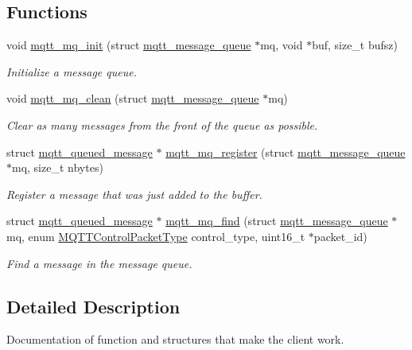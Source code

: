 \subsection*{Functions}
\begin{DoxyCompactItemize}
\item 
void \hyperlink{group__details_ga0da861c969387bf8d0229924543d9bb7}{mqtt\+\_\+mq\+\_\+init} (struct \hyperlink{structmqtt__message__queue}{mqtt\+\_\+message\+\_\+queue} $\ast$mq, void $\ast$buf, size\+\_\+t bufsz)
\begin{DoxyCompactList}\small\item\em Initialize a message queue. \end{DoxyCompactList}\item 
void \hyperlink{group__details_gadb54c413b4d884619c50cc20ee6eb084}{mqtt\+\_\+mq\+\_\+clean} (struct \hyperlink{structmqtt__message__queue}{mqtt\+\_\+message\+\_\+queue} $\ast$mq)
\begin{DoxyCompactList}\small\item\em Clear as many messages from the front of the queue as possible. \end{DoxyCompactList}\item 
struct \hyperlink{structmqtt__queued__message}{mqtt\+\_\+queued\+\_\+message} $\ast$ \hyperlink{group__details_gaa34e6af3ab1af60ebf8fe7b86be868fc}{mqtt\+\_\+mq\+\_\+register} (struct \hyperlink{structmqtt__message__queue}{mqtt\+\_\+message\+\_\+queue} $\ast$mq, size\+\_\+t nbytes)
\begin{DoxyCompactList}\small\item\em Register a message that was just added to the buffer. \end{DoxyCompactList}\item 
struct \hyperlink{structmqtt__queued__message}{mqtt\+\_\+queued\+\_\+message} $\ast$ \hyperlink{group__details_ga1ffcd45af057865a0d85b4e9e24789a2}{mqtt\+\_\+mq\+\_\+find} (struct \hyperlink{structmqtt__message__queue}{mqtt\+\_\+message\+\_\+queue} $\ast$mq, enum \hyperlink{group__unpackers_gacbd36b88ec7f62bc161b07e1a0aed679}{M\+Q\+T\+T\+Control\+Packet\+Type} control\+\_\+type, uint16\+\_\+t $\ast$packet\+\_\+id)
\begin{DoxyCompactList}\small\item\em Find a message in the message queue. \end{DoxyCompactList}\end{DoxyCompactItemize}


\subsection{Detailed Description}
Documentation of function and structures that make the client work. 

